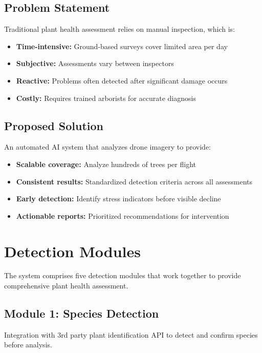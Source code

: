\documentclass[11pt,a4paper]{article}
\begin{document}
\subsection{Problem Statement}

Traditional plant health assessment relies on manual inspection, which is:
\begin{itemize}[leftmargin=*]
\item \textbf{Time-intensive:} Ground-based surveys cover limited area per day
\item \textbf{Subjective:} Assessments vary between inspectors
\item \textbf{Reactive:} Problems often detected after significant damage occurs
\item \textbf{Costly:} Requires trained arborists for accurate diagnosis
\end{itemize}

\subsection{Proposed Solution}

An automated AI system that analyzes drone imagery to provide:
\begin{itemize}[leftmargin=*]
\item \textbf{Scalable coverage:} Analyze hundreds of trees per flight
\item \textbf{Consistent results:} Standardized detection criteria across all assessments
\item \textbf{Early detection:} Identify stress indicators before visible decline
\item \textbf{Actionable reports:} Prioritized recommendations for intervention
\end{itemize}

\section{Detection Modules}

The system comprises five detection modules that work together to provide comprehensive plant health assessment.

\subsection{Module 1: Species Detection}

Integration with 3rd party plant identification API to detect and confirm species before analysis.
\end{document}

